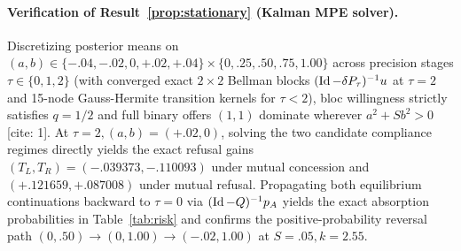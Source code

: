 \paragraph{Verification of Result~\ref{prop:stationary} (Kalman MPE solver).}
Discretizing posterior means on $(a,b)\in\{-.04,-.02,0,+.02,+.04\}\times\{0,.25,.50,.75,1.00\}$ across precision stages $\tau\in\{0,1,2\}$ (with converged exact $2\times 2$ Bellman blocks $(\operatorname{Id}-\delta P_\tau)^{-1}u$ at $\tau=2$ and 15-node Gauss-Hermite transition kernels for $\tau<2$), bloc willingness strictly satisfies $q=1/2$ and full binary offers $(1,1)$ dominate wherever $a^2+Sb^2>0$[cite: 1]. At $\tau=2,(a,b)=(+.02,0)$, solving the two candidate compliance regimes directly yields the exact refusal gains $(T_L,T_R)=(-.039373,-.110093)$ under mutual concession and $(+.121659,+.087008)$ under mutual refusal. Propagating both equilibrium continuations backward to $\tau=0$ via $(\operatorname{Id}-Q)^{-1}p_A$ yields the exact absorption probabilities in Table~\ref{tab:risk} and confirms the positive-probability reversal path $(0,.50)\to(0,1.00)\to(-.02,1.00)$ at $S=.05,k=2.55$.
